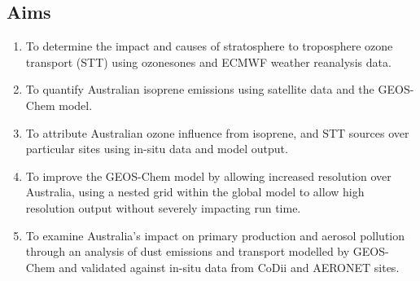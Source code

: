 
\subsection{Aims}
\begin{enumerate}
\item To determine the impact and causes of stratosphere to troposphere ozone transport (STT) using ozonesones and ECMWF weather reanalysis data.
\item To quantify Australian isoprene emissions using satellite data and the GEOS-Chem model. 
\item To attribute Australian ozone influence from isoprene, and STT sources over particular sites using in-situ data and model output.
\item To improve the GEOS-Chem model by allowing increased resolution over Australia, using a nested grid within the global model to allow high resolution output without severely impacting run time.
\item To examine Australia's impact on primary production and aerosol pollution through an analysis of dust emissions and transport modelled by GEOS-Chem and validated against in-situ data from CoDii and AERONET sites.
\end{enumerate}